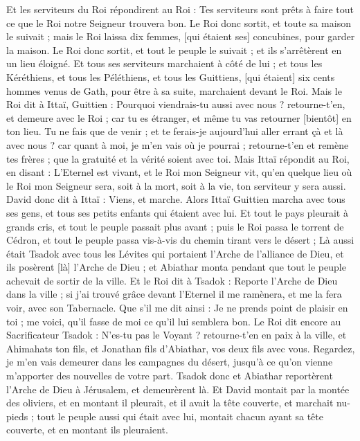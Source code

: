 \begin{multicols}{2}
Et les serviteurs du Roi répondirent au Roi : Tes serviteurs sont prêts à faire tout ce que le Roi notre Seigneur trouvera bon.
Le Roi donc sortit, et toute sa maison le suivait ; mais le Roi laissa dix femmes, [qui étaient ses] concubines, pour garder la maison.
Le Roi donc sortit, et tout le peuple le suivait ; et ils s'arrêtèrent en un lieu éloigné.
Et tous ses serviteurs marchaient à côté de lui ; et tous les Kéréthiens, et tous les Péléthiens, et tous les Guittiens, [qui étaient] six cents hommes venus de Gath, pour être à sa suite, marchaient devant le Roi.
Mais le Roi dit à Ittaï, Guittien : Pourquoi viendrais-tu aussi avec nous ? retourne-t'en, et demeure avec le Roi ; car tu es étranger, et même tu vas retourner [bientôt] en ton lieu.
Tu ne fais que de venir ; et te ferais-je aujourd'hui aller errant çà et là avec nous ? car quant à moi, je m'en vais où je pourrai ; retourne-t'en et remène tes frères ; que la gratuité et la vérité soient avec toi.
Mais Ittaï répondit au Roi, en disant : L'Eternel est vivant, et le Roi mon Seigneur vit, qu'en quelque lieu où le Roi mon Seigneur sera, soit à la mort, soit à la vie, ton serviteur y sera aussi.
David donc dit à Ittaï : Viens, et marche. Alors Ittaï Guittien marcha avec tous ses gens, et tous ses petits enfants qui étaient avec lui.
Et tout le pays pleurait à grands cris, et tout le peuple passait plus avant ; puis le Roi passa le torrent de Cédron, et tout le peuple passa vis-à-vis du chemin tirant vers le désert ;
Là aussi était Tsadok avec tous les Lévites qui portaient l'Arche de l'alliance de Dieu, et ils posèrent [là] l'Arche de Dieu ; et Abiathar monta pendant que tout le peuple achevait de sortir de la ville.
Et le Roi dit à Tsadok : Reporte l'Arche de Dieu dans la ville ; si j'ai trouvé grâce devant l'Eternel il me ramènera, et me la fera voir, avec son Tabernacle.
Que s'il me dit ainsi : Je ne prends point de plaisir en toi ; me voici, qu'il fasse de moi ce qu'il lui semblera bon.
Le Roi dit encore au Sacrificateur Tsadok : N'es-tu pas le Voyant ? retourne-t'en en paix à la ville, et Ahimahats ton fils, et Jonathan fils d'Abiathar, vos deux fils avec vous.
Regardez, je m'en vais demeurer dans les campagnes du désert, jusqu'à ce qu'on vienne m'apporter des nouvelles de votre part.
Tsadok donc et Abiathar reportèrent l'Arche de Dieu à Jérusalem, et demeurèrent là.
Et David montait par la montée des oliviers, et en montant il pleurait, et il avait la tête couverte, et marchait nu-pieds ; tout le peuple aussi qui était avec lui, montait chacun ayant sa tête couverte, et en montant ils pleuraient.

\end{multicols}
